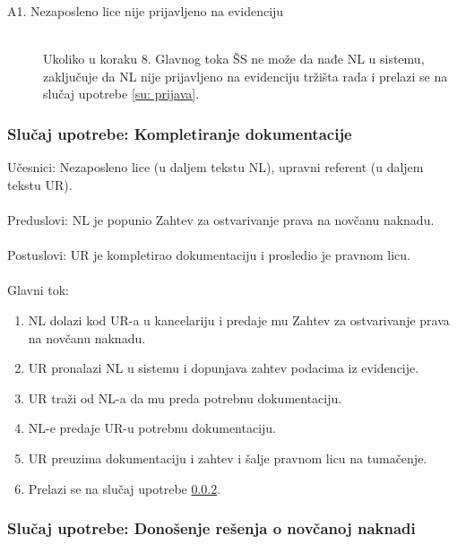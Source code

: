 \begin{description}
	\item[A1. Nezaposleno lice nije prijavljeno na evidenciju] ~\\
	Ukoliko u koraku 8. Glavnog toka ŠS ne može da nađe NL u sistemu, zaključuje da NL nije prijavljeno na evidenciju tržišta rada i prelazi se na slučaj upotrebe \ref{su: prijava}.
\end{description}

\subsubsection{Slu\v caj upotrebe: Kompletiranje dokumentacije}
\label{su: kompletiranje dokumentacije}

\noindent Učesnici: Nezaposleno lice (u daljem tekstu NL), upravni referent (u daljem tekstu UR).
\\
\\ Preduslovi: NL je popunio Zahtev za ostvarivanje prava na novčanu naknadu.
\\
\\ Postuslovi: UR je kompletirao dokumentaciju i prosledio je pravnom licu.
\\
\\ Glavni tok:
\begin{enumerate}
\item NL dolazi kod UR-a u kancelariju i predaje mu Zahtev za ostvarivanje prava na novčanu naknadu.
\item UR pronalazi NL u sistemu i dopunjava zahtev podacima iz evidencije.
\item UR traži od NL-a da mu preda potrebnu dokumentaciju.
\item NL-e predaje UR-u potrebnu dokumentaciju.
\item UR preuzima dokumentaciju i zahtev i šalje pravnom licu na tumačenje.
\item Prelazi se na slu\v caj upotrebe \ref{su: resenje}.
\end{enumerate}

\subsubsection{Slu\v caj upotrebe: Donošenje rešenja o novčanoj naknadi}
\label{su: resenje}

